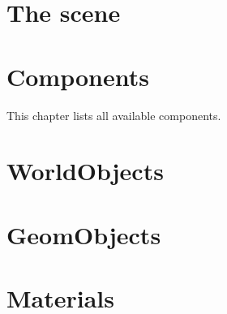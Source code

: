 \documentclass{manual}
\begin{document}
\chapter{The scene\label{scene}}




\chapter{Components \label{components}}


This chapter lists all available components.
















\chapter{WorldObjects \label{worldobjects}}


























\chapter{GeomObjects \label{geomobjects}}











\chapter{Materials \label{materials}}
\end{document}
